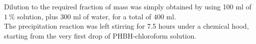 \documentclass[a4paper]{article}
\begin{document}




%


%

        Dilution to the required fraction of mass was simply obtained by using 100 ml of $1 \ \%$ solution, 
        plus 300 ml of water, for a total of 400 ml. \\ 

        The precipitation reaction was left stirring for 7.5 hours under a 
        chemical hood, starting from the very first drop of PHBH-chloroform solution. 
\end{document}
